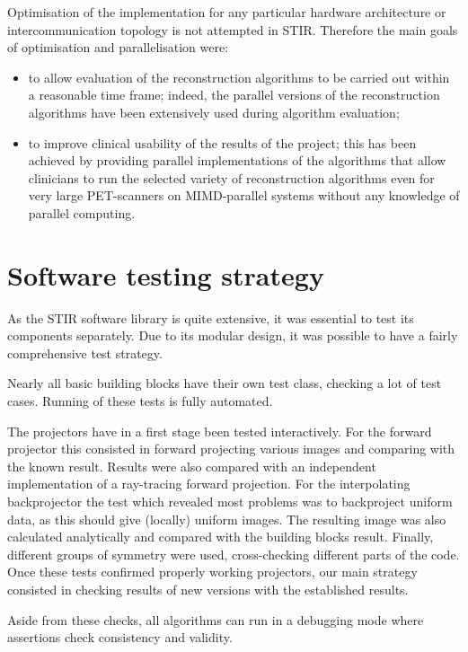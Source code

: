 \documentclass{article}
\begin{document}
Optimisation of the implementation for any particular hardware 
architecture or intercommunication topology is not attempted 
in STIR. Therefore the main goals of optimisation and parallelisation 
were:
\begin{itemize}
\item to allow evaluation of the reconstruction algorithms to be 
carried out within a reasonable time frame; indeed, the parallel 
versions of the reconstruction algorithms have been extensively 
used during algorithm evaluation;
\item to improve clinical usability of the results of the project; 
this has been achieved by providing parallel implementations 
of the algorithms that allow clinicians to run the selected variety 
of reconstruction algorithms even for very large PET-scanners 
on MIMD-parallel systems without any knowledge of parallel computing.
\end{itemize}


\section{
Software testing strategy}

As the STIR software library is quite extensive, it was essential 
to test its components separately. Due to its modular design, 
it was possible to have a fairly comprehensive test strategy.

Nearly all basic building blocks have their own test class, checking 
a lot of test cases. Running of these tests is fully automated.

The projectors have in a first stage been tested interactively. 
For the forward projector this consisted in forward projecting 
various images and comparing with the known result. Results were 
also compared with an independent implementation of a ray-tracing 
forward projection. For the interpolating backprojector the test 
which revealed most problems was to backproject uniform data, 
as this should give (locally) uniform images. The resulting image 
was also calculated analytically and compared with the building 
blocks result. Finally, different groups of symmetry were used, 
cross-checking different parts of the code. Once these tests 
confirmed properly working projectors, our main strategy consisted 
in checking results of new versions with the established results.

Aside from these checks, all algorithms can run in a debugging 
mode where assertions  check consistency and validity.
\end{document}
